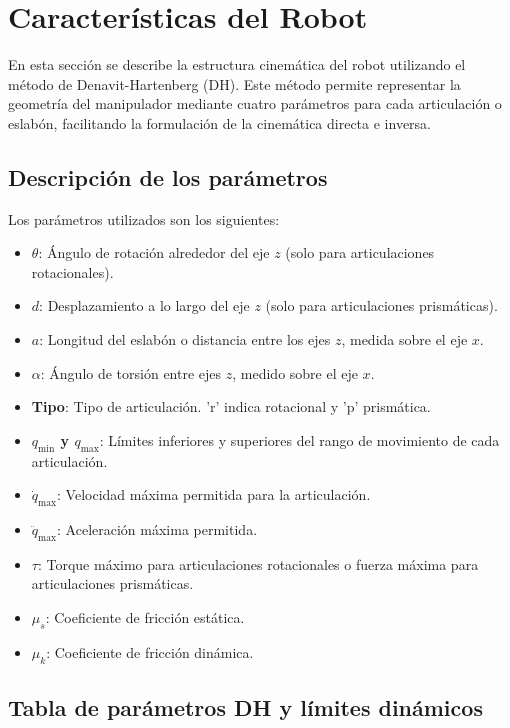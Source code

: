 \section{Características del Robot} \label{sec:caracteristicas_del_robot}


En esta sección se describe la estructura cinemática del robot utilizando el método de Denavit-Hartenberg (DH). Este método permite representar la geometría del manipulador mediante cuatro parámetros para cada articulación o eslabón, facilitando la formulación de la cinemática directa e inversa.

\subsection*{Descripción de los parámetros}

Los parámetros utilizados son los siguientes:

\begin{itemize}
	\item \textbf{\(\theta\)}: Ángulo de rotación alrededor del eje \(z\) (solo para articulaciones rotacionales).
	\item \textbf{\(d\)}: Desplazamiento a lo largo del eje \(z\) (solo para articulaciones prismáticas).
	\item \textbf{\(a\)}: Longitud del eslabón o distancia entre los ejes \(z\), medida sobre el eje \(x\).
	\item \textbf{\(\alpha\)}: Ángulo de torsión entre ejes \(z\), medido sobre el eje \(x\).
	\item \textbf{Tipo}: Tipo de articulación. 'r' indica rotacional y 'p' prismática.
	\item \textbf{\(q_{\text{min}}\) y \(q_{\text{max}}\)}: Límites inferiores y superiores del rango de movimiento de cada articulación.
	\item \textbf{\(\dot{q}_{\text{max}}\)}: Velocidad máxima permitida para la articulación.
	\item \textbf{\(\ddot{q}_{\text{max}}\)}: Aceleración máxima permitida.
	\item \textbf{\(\tau\)}: Torque máximo para articulaciones rotacionales o fuerza máxima para articulaciones prismáticas.
	\item \textbf{\(\mu_s\)}: Coeficiente de fricción estática.
	\item \textbf{\(\mu_k\)}: Coeficiente de fricción dinámica.
\end{itemize}

\subsection*{Tabla de parámetros DH y límites dinámicos}

